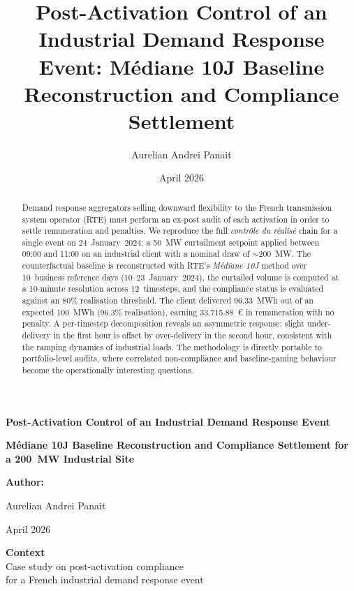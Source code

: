 \documentclass{article}
\title{Post-Activation Control of an Industrial Demand Response Event: M\'ediane 10J Baseline Reconstruction and Compliance Settlement}
\author{Aurelian Andrei Panait}
\date{April 2026}
\begin{document}
\begin{titlepage}
    \centering


    \vspace*{1cm}

    {\Huge \textbf{Post-Activation Control of an Industrial Demand Response Event} \par}
    \vspace{0.5cm}
    {\Large \textbf{M\'ediane 10J Baseline Reconstruction and Compliance Settlement for a 200~MW Industrial Site} \par}

    \vspace{1.5cm}

    {\Large \textbf{Author:}} \\
    {\Large Aurelian Andrei Panait \par}

    \vspace{1cm}
    {\Large April 2026 \par}

    \vfill

    {\Large \textbf{Context}}\\[0.2cm]
    {\Large Case study on post-activation compliance}\\
    {\Large for a French industrial demand response event}\\

    \vfill

\end{titlepage}

\clearpage

\begin{abstract}
\large
Demand response aggregators selling downward flexibility to the French transmission system operator (RTE) must perform an ex-post audit of each activation in order to settle remuneration and penalties. We reproduce the full \textit{contr\^ole du r\'ealis\'e} chain for a single event on 24~January~2024: a 50~MW curtailment setpoint applied between 09:00 and 11:00 on an industrial client with a nominal draw of $\sim$200~MW. The counterfactual baseline is reconstructed with RTE's \textit{M\'ediane 10J} method over 10~business reference days (10--23~January~2024), the curtailed volume is computed at a 10-minute resolution across 12~timesteps, and the compliance status is evaluated against an 80\% realisation threshold. The client delivered 96.33~MWh out of an expected 100~MWh (96.3\% realisation), earning 33{,}715.88~\euro{} in remuneration with no penalty. A per-timestep decomposition reveals an asymmetric response: slight under-delivery in the first hour is offset by over-delivery in the second hour, consistent with the ramping dynamics of industrial loads. The methodology is directly portable to portfolio-level audits, where correlated non-compliance and baseline-gaming behaviour become the operationally interesting questions.
\end{abstract}
\end{document}
